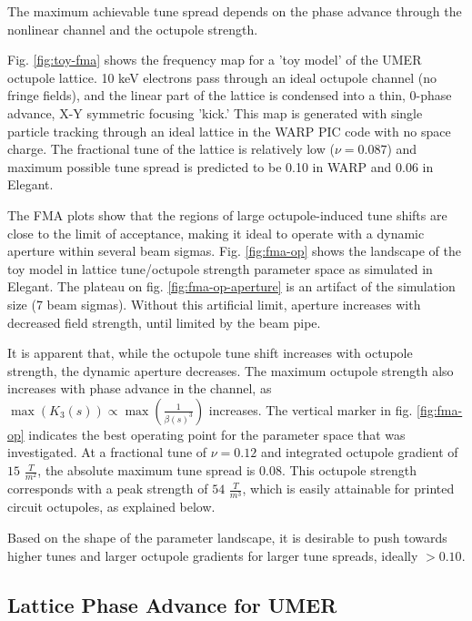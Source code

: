 The maximum achievable tune spread depends on the phase advance through the nonlinear channel and the octupole strength.
 

Fig. \ref{fig:toy-fma} shows the frequency map for a 'toy model' of the UMER octupole lattice. 10 keV electrons pass through an ideal octupole channel (no fringe fields), and the linear part of the lattice is condensed into a thin, 0-phase advance, X-Y symmetric focusing 'kick.'
This map is generated with single particle tracking through an ideal lattice in the WARP PIC code \cite{warp} with no space charge. 
The fractional tune of the lattice is relatively low ($\nu = 0.087$) and maximum possible tune spread is predicted to be 0.10 in WARP and 0.06 in Elegant. 



The FMA plots show that the regions of large octupole-induced tune shifts are close to the limit of acceptance, making it ideal to operate with a dynamic aperture within several beam sigmas. 
Fig. \ref{fig:fma-op} shows the landscape of the toy model in lattice tune/octupole strength parameter space as simulated in Elegant. 
The plateau on fig. \ref{fig:fma-op-aperture} is an artifact of the simulation size (7 beam sigmas). Without this artificial limit, aperture increases with decreased field strength, until limited by the beam pipe.

It is apparent that, while the octupole tune shift increases with octupole strength, the dynamic aperture decreases. 
The maximum octupole strength also increases with phase advance in the channel, as $\max{\left( K_3(s)\right)} \propto \max{\left(\frac{1}{\beta(s)^3}\right)}$ increases. 
The vertical marker in fig. \ref{fig:fma-op} indicates the best operating point for the parameter space that was investigated. 
At a fractional tune of $\nu = 0.12$ and integrated octupole gradient of $15$  $\frac{T}{m^2}$, the absolute maximum tune spread is $0.08$. 
This octupole strength corresponds with a peak strength of $54$  $\frac{T}{m^3}$, which is easily attainable for printed circuit octupoles, as explained below.

Based on the shape of the parameter landscape, it is desirable to push towards higher tunes and larger octupole gradients for larger tune spreads, ideally $> 0.10$.


\subsection{Lattice Phase Advance for UMER }

